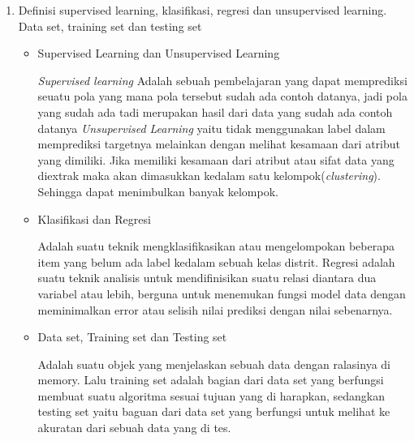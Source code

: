 \begin{enumerate}
\item Definisi supervised learning, klasifikasi, regresi dan unsupervised learning. Data set, training set dan testing set
\begin{itemize}
    \item Supervised Learning dan Unsupervised Learning
    \par
    \textit{Supervised learning}
    Adalah sebuah pembelajaran yang dapat memprediksi seuatu pola yang mana pola tersebut sudah ada contoh datanya, jadi pola yang sudah ada tadi merupakan hasil dari data yang sudah ada contoh datanya
    \textit{Unsupervised Learning} yaitu tidak menggunakan label dalam memprediksi targetnya melainkan dengan melihat kesamaan dari atribut yang dimiliki. Jika memiliki kesamaan dari atribut atau sifat data yang diextrak maka akan dimasukkan kedalam satu kelompok(\textit{clustering}). Sehingga dapat menimbulkan banyak kelompok.
    \item Klasifikasi dan Regresi
    \par
    Adalah suatu teknik mengklasifikasikan atau mengelompokan beberapa item yang belum ada label kedalam sebuah kelas distrit. Regresi adalah suatu teknik analisis untuk mendifinisikan suatu relasi diantara dua variabel atau lebih, berguna untuk menemukan fungsi model data dengan meminimalkan error atau selisih nilai prediksi dengan nilai sebenarnya.
    
    \item Data set, Training set dan Testing set
    \par
    Adalah suatu objek yang menjelaskan sebuah data dengan ralasinya di memory. Lalu training set adalah bagian dari data set yang berfungsi membuat suatu algoritma sesuai tujuan yang di harapkan, sedangkan testing set yaitu baguan dari data set yang berfungsi untuk melihat ke akuratan dari sebuah data yang di tes.
\end{itemize}
\end{enumerate}

